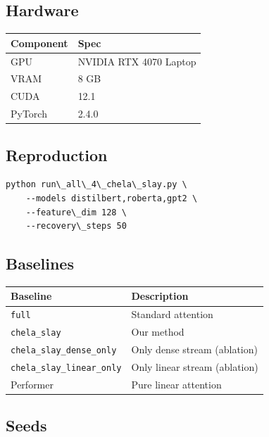 \subsection{Hardware}

\begin{table}[H]
\centering
\small
\begin{tabular}{ll}
\toprule
\textbf{Component} & \textbf{Spec} \\
\midrule
GPU & NVIDIA RTX 4070 Laptop \\
VRAM & 8 GB \\
CUDA & 12.1 \\
PyTorch & 2.4.0 \\
\bottomrule
\end{tabular}
\end{table}

\subsection{Reproduction}

\begin{lstlisting}
python run\_all\_4\_chela\_slay.py \
    --models distilbert,roberta,gpt2 \
    --feature\_dim 128 \
    --recovery\_steps 50
\end{lstlisting}

\subsection{Baselines}

\begin{table}[H]
\centering
\small
\begin{tabular}{ll}
\toprule
\textbf{Baseline} & \textbf{Description} \\
\midrule
\texttt{full} & Standard attention \\
\texttt{chela\_slay} & Our method \\
\texttt{chela\_slay\_dense\_only} & Only dense stream (ablation) \\
\texttt{chela\_slay\_linear\_only} & Only linear stream (ablation) \\
Performer & Pure linear attention \\
\bottomrule
\end{tabular}
\end{table}

\subsection{Seeds}


